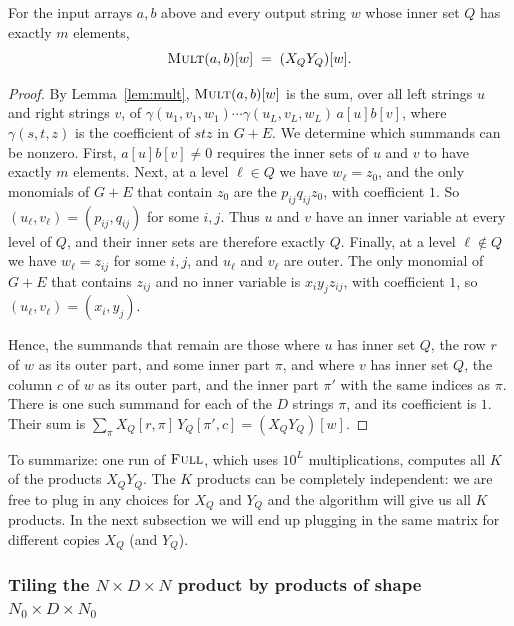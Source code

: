 \begin{lemma}\label{lem:correct}
For the input arrays $a,b$ above and every output string $w$ whose inner set $Q$ has exactly $m$ elements,
\begin{equation}\label{eq:sum}
\textnormal{\textsc{Mult}}(a,b)[w]\;=\;(X_QY_Q)[w] .
\end{equation}
\end{lemma}

\begin{proof}
By Lemma~\ref{lem:mult}, $\textnormal{\textsc{Mult}}(a,b)[w]$ is the sum, over all left strings $u$ and right strings $v$, of $\gamma(u_1,v_1,w_1)\cdots\gamma(u_L,v_L,w_L)\,a[u]b[v]$, where $\gamma(s,t,z)$ is the coefficient of $stz$ in $G+E$. We determine which summands can be nonzero. First, $a[u]b[v]\ne0$ requires the inner sets of $u$ and $v$ to have exactly $m$ elements. Next, at a level $\ell\in Q$ we have $w_\ell=z_0$, and the only monomials of $G+E$ that contain $z_0$ are the $p_{ij}q_{ij}z_0$, with coefficient $1$. So $(u_\ell,v_\ell)=(p_{ij},q_{ij})$ for some $i,j$. Thus $u$ and $v$ have an inner variable at every level of $Q$, and their inner sets are therefore exactly $Q$. Finally, at a level $\ell\notin Q$ we have $w_\ell=z_{ij}$ for some $i,j$, and $u_\ell$ and $v_\ell$ are outer. The only monomial of $G+E$ that contains $z_{ij}$ and no inner variable is $x_iy_jz_{ij}$, with coefficient $1$, so $(u_\ell,v_\ell)=(x_i,y_j)$.

Hence, the summands that remain are those where $u$ has inner set $Q$, the row $r$ of $w$ as its outer part, and some inner part $\pi$, and where $v$ has inner set $Q$, the column $c$ of $w$ as its outer part, and the inner part $\pi'$ with the same indices as $\pi$. There is one such summand for each of the $D$ strings $\pi$, and its coefficient is $1$. Their sum is $\sum_\pi X_Q[r,\pi]\,Y_Q[\pi',c]=(X_QY_Q)[w]$.
\end{proof}

To summarize: one run of $\textnormal{\textsc{Full}}$, which uses $10^L$ multiplications, computes all $K$ of the products $X_QY_Q$. The $K$ products can be completely independent: we are free to plug in any choices for $X_Q$ and $Y_Q$ and the algorithm will give us all $K$ products. In the next subsection we will end up plugging in the same matrix for different copies $X_Q$ (and $Y_Q$). 



\subsubsection{\texorpdfstring{Tiling the $N\times D\times N$ product by products of shape $N_0\times D\times N_0$}{Tiling the N x D x N product by products of shape N0 x D x N0}}\label{sec:tiling}

